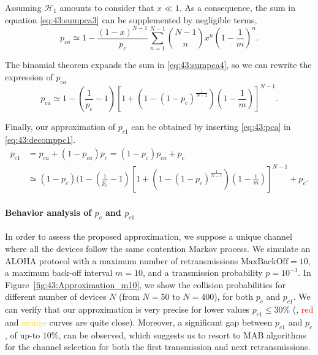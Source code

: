 Assuming $\mathcal{H}_{1}$ amounts to consider that $x\ll 1$. As a consequence, the sum in equation \eqref{eq:43:sumpca3} can be supplemented by negligible terms,
%
\begin{equation}\label{eq:43:sumpca4}
	p_{ca} \simeq  1 - \frac{\left(1-x\right)^{N-1}}{p_c}\sum_{n=1}^{N-1}{N-1 \choose n} x^n \left( 1-\frac{1}{m}\right)^n.
\end{equation}

The binomial theorem expands the sum in \eqref{eq:43:sumpca4}, so we can rewrite the expression of $p_{ca}$
%
\begin{equation}\label{eq:43:pca}
	p_{ca} \simeq 1 - \left(\frac{1}{p_c}-1\right)\left[ 1+\left(1-\left(1-p_c\right)^{\frac{1}{N-1}}\right)\left(1-\frac{1}{m}\right)\right]^{N-1}.
\end{equation}

Finally, our approximation of $p_{c1}$ can be obtained by inserting \eqref{eq:43:pca} in \eqref{eq:43:decomppc1}.
%
\begin{align}\label{eq:43:final_expression_pc1}
	p_{c1} &= p_{ca}+\left(1-p_{ca}\right)p_c = (1 - p_c) p_{ca} + p_c \nonumber \\
	&\simeq \left(1 - p_c\right) (1 - \left(\frac{1}{p_c}-1\right)\left[ 1+\left(1-\left(1-p_c\right)^{\frac{1}{N-1}}\right)\left(1-\frac{1}{m}\right)\right]^{N-1} + p_c.
\end{align}


\paragraph{Behavior analysis of $p_{c}$ and $p_{c1}$}\label{sub:43:numericalValidationPC1PC}

In order to assess the proposed approximation, we suppose a unique channel where all the devices follow the same contention Markov process.
We simulate an ALOHA protocol with a maximum number of retransmissions $\mathrm{MaxBackOff}=10$, a maximum back-off interval $m=10$, and a transmission probability $p=10^{-3}$.
%
In Figure~\ref{fig:43:Approximation_m10}, we show the collision probabilities for different number of devices $N$ (from $N=50$ to $N=400$), for both $p_{c}$ and $p_{c1}$.
%
We can verify that our approximation is very precise for lower values $p_{c1} \leq 30 \%$ (\ie, \textcolor{red}{red} and \textcolor{gold}{orange} curves are quite close).
Moreover, a significant gap between $p_{c1}$ and $p_c$,
of up-to $10\%$, can be observed,
which suggests us to resort to MAB algorithms for the channel selection for both the first transmission and next retransmissions.

